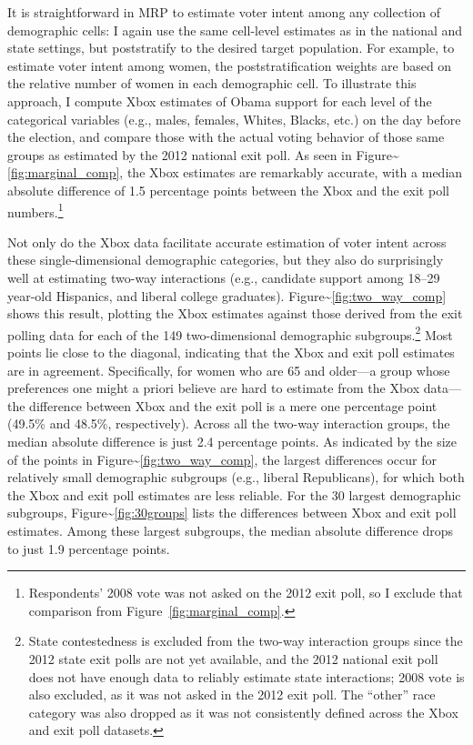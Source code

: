 It is straightforward in MRP to estimate voter intent among any
collection of demographic cells: I again use the same cell-level
estimates as in the national and state settings, but poststratify to the
desired target population. For example, to estimate voter intent among
women, the poststratification weights are based on the relative number
of women in each demographic cell. To illustrate this approach, I
compute Xbox estimates of Obama support for each level of the
categorical variables (e.g., males, females, Whites, Blacks, etc.) on
the day before the election, and compare those with the actual voting
behavior of those same groups as estimated by the 2012 national exit
poll. As seen in Figure\textasciitilde{}\ref{fig:marginal_comp}, the
Xbox estimates are remarkably accurate, with a median absolute
difference of 1.5 percentage points between the Xbox and the exit poll
numbers.\footnote{Respondents' 2008 vote was not asked on
the 2012 exit poll, so I exclude that comparison from
Figure~\ref{fig:marginal_comp}.}

Not only do the Xbox data facilitate accurate estimation of voter intent
across these single-dimensional demographic categories, but they also do
surprisingly well at estimating two-way interactions (e.g., candidate
support among 18--29 year-old Hispanics, and liberal college graduates).
Figure\textasciitilde{}\ref{fig:two_way_comp} shows this result,
plotting the Xbox estimates against those derived from the exit polling
data for each of the 149 two-dimensional demographic
subgroups.\footnote{State contestedness is excluded
from the two-way interaction groups since the 2012 state exit polls are not yet
available, and the 2012 national exit poll does not have enough data to reliably
estimate state interactions; 2008 vote is also excluded, as it was not asked in
the 2012 exit poll. The ``other'' race category was also dropped as it was not
consistently defined across the Xbox and exit poll datasets.} Most
points lie close to the diagonal, indicating that the Xbox and exit poll
estimates are in agreement. Specifically, for women who are 65 and
older---a group whose preferences one might a priori believe are hard to
estimate from the Xbox data---the difference between Xbox and the exit
poll is a mere one percentage point (49.5\% and 48.5\%, respectively).
Across all the two-way interaction groups, the median absolute
difference is just 2.4 percentage points. As indicated by the size of
the points in Figure\textasciitilde{}\ref{fig:two_way_comp}, the largest
differences occur for relatively small demographic subgroups (e.g.,
liberal Republicans), for which both the Xbox and exit poll estimates
are less reliable. For the 30 largest demographic subgroups,
Figure\textasciitilde{}\ref{fig:30groups} lists the differences between
Xbox and exit poll estimates. Among these largest subgroups, the median
absolute difference drops to just 1.9 percentage points.

